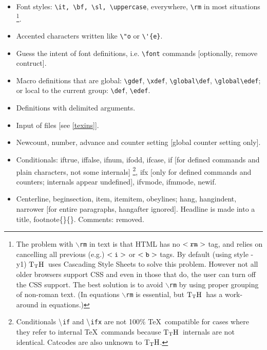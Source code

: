 \documentclass[12pt]{article}
\def\TtH{$\rm{}T_TH$}
\begin{document}
\begin{itemize}

\item{}
Font styles: \verb|\it, \bf, \sl, \uppercase|, everywhere,
\verb|\rm| in most situations
\footnote{The problem with {\tt$\backslash$rm} in text is that HTML
has no {$\tt <rm>$} tag, and relies on cancelling all previous (e.g.)
{$\tt <i>$} or {$\tt <b>$} tags. By default (using style -y1)
\TtH\ uses Cascading Style Sheets to solve this problem. However not
all older browsers support CSS and even in those that do, the user can
turn off the CSS support. The best solution is to avoid
{\tt$\backslash$rm} by using proper grouping of non-roman text. (In
equations {\tt$\backslash$rm} is essential, but \TtH\ has a
work-around in equations.)}.

\item Accented characters written like \verb|\"o| or \verb|\'{e}|. 

\item Guess the intent of font definitions, i.e. \verb|\font| commands
[optionally, remove contruct].

\item Macro definitions that are global: \verb|\gdef|, \verb|\xdef|,
\verb|\global\def|, \verb|\global\edef|; or local to the
current group: \verb|\def|, \verb|\edef|.
 
\item Definitions with delimited arguments.

\item Input of files [see \ref{texins}].

\item Newcount, number, advance and counter setting [global counter setting
only].
\label{ifs}

\item Conditionals: iftrue,
iffalse,
ifnum,
ifodd,
ifcase,
if   [for defined commands and plain characters, not some internals]
\footnote{Conditionals {$\tt\backslash$\tt{}if}
 and {$\tt\backslash$\tt{}ifx} are not 100\% \TeX\ compatible for cases
where they refer to internal \TeX\ commands because \TtH\ internals are
not identical. Catcodes are also unknown to \TtH.}, ifx [only for
defined commands and counters; internals appear undefined], ifvmode,
ifmmode, newif.

\item Centerline, beginsection, item, itemitem, obeylines; hang, hangindent,
narrower [for entire paragraphs, hangafter ignored].
 Headline is made
into a title, footnote\{\}\{\}. Comments: removed.


\end{itemize}
\end{document}

